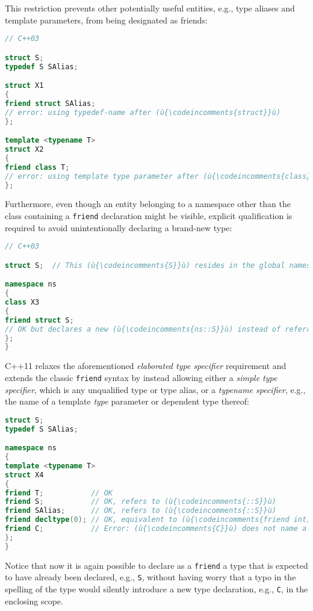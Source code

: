 \noindent This restriction prevents other potentially useful entities, e.g., type
aliases and template parameters, from being designated as friends:

\begin{lstlisting}[language=C++]
// C++03

struct S;
typedef S SAlias;

struct X1
{
friend struct SAlias;
// error: using typedef-name after (ù{\codeincomments{struct}}ù)
};

template <typename T>
struct X2
{
friend class T;
// error: using template type parameter after (ù{\codeincomments{class}}ù)
};
\end{lstlisting}

\noindent Furthermore, even though an entity belonging to a namespace other than
the class containing a \texttt{friend} declaration might be visible,
explicit qualification is required to avoid unintentionally declaring a
brand-new type:

\begin{lstlisting}[language=C++]
// C++03

struct S;  // This (ù{\codeincomments{S}}ù) resides in the global namespace.

namespace ns
{
class X3
{
friend struct S;
// OK but declares a new (ù{\codeincomments{ns::S}}ù) instead of referring to (ù{\codeincomments{::S}}ù)
};
}
\end{lstlisting}

\noindent C++11 relaxes the aforementioned \emph{elaborated type specifier}
requirement and extends the classic \texttt{friend} syntax by instead
allowing either a \emph{simple type specifier}, which is any unqualified
type or type alias, or a \emph{typename specifier}, e.g., the name of a
template \emph{type} parameter or dependent type thereof:

\begin{lstlisting}[language=C++]
struct S;
typedef S SAlias;

namespace ns
{
template <typename T>
struct X4
{
friend T;           // OK
friend S;           // OK, refers to (ù{\codeincomments{::S}}ù)
friend SAlias;      // OK, refers to (ù{\codeincomments{::S}}ù)
friend decltype(0); // OK, equivalent to (ù{\codeincomments{friend int;}}ù)
friend C;           // Error: (ù{\codeincomments{C}}ù) does not name a type.
};
}
\end{lstlisting}

\noindent Notice that now it is again possible to declare as a \texttt{friend} a
type that is expected to have already been declared, e.g., \texttt{S},
without having worry that a typo in the spelling of the type would
silently introduce a new type declaration, e.g., \texttt{C}, in the
enclosing scope.

